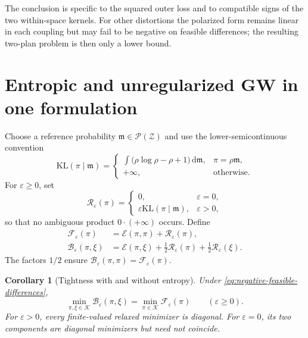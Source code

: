 \documentclass[11pt]{article}
\newtheorem{corollary}[theorem]{Corollary}
\theoremstyle{definition}
\theoremstyle{remark}
\newcommand{\Pcal}{\mathcal P}
\newcommand{\Kcal}{\mathcal K}
\newcommand{\Ee}{\mathcal E}
\newcommand{\Fcal}{\mathcal F}
\newcommand{\Bcal}{\mathcal B}
\newcommand{\Rcal}{\mathcal R}
\newcommand{\dd}{\,\mathrm d}
\newcommand{\eps}{\varepsilon}
\newcommand{\KL}{\mathrm{KL}}
\begin{document}
The conclusion is specific to the squared outer loss and to compatible signs
of the two within-space kernels.  For other distortions the polarized form
remains linear in each coupling but may fail to be negative on feasible
differences; the resulting two-plan problem is then only a lower bound.

\section{Entropic and unregularized GW in one formulation}
\label{sec:entropic-gw}

Choose a reference probability \(\mathfrak m\in\Pcal(\mathcal Z)\) and use
the lower-semicontinuous convention
\begin{equation}\label{eq:relative-entropy}
  \KL(\pi\mid\mathfrak m)
  =
  \begin{cases}
  \displaystyle
  \int\bigl(\rho\log\rho-\rho+1\bigr)\dd\mathfrak m,
  &\pi=\rho\mathfrak m,\\
  +\infty,&\text{otherwise}.
  \end{cases}
\end{equation}
For \(\eps\geq0\), set
\begin{equation}\label{eq:epsilon-regularizer}
  \Rcal_\eps(\pi)
  =
  \begin{cases}
    0,&\eps=0,\\
    \eps\KL(\pi\mid\mathfrak m),&\eps>0,
  \end{cases}
\end{equation}
so that no ambiguous product \(0\cdot(+\infty)\) occurs.  Define
\begin{align}
  \Fcal_\eps(\pi)
  &=\Ee(\pi,\pi)+\Rcal_\eps(\pi),
  \label{eq:epsilon-diagonal-objective}\\
  \Bcal_\eps(\pi,\xi)
  &=\Ee(\pi,\xi)
  +\frac12\Rcal_\eps(\pi)
  +\frac12\Rcal_\eps(\xi).
  \label{eq:epsilon-biconvex-objective}
\end{align}
The factors \(1/2\) ensure
\(
 \Bcal_\eps(\pi,\pi)=\Fcal_\eps(\pi)
\).

\begin{corollary}[Tightness with and without entropy]
\label{cor:entropic-tightness}
Under \eqref{eq:negative-feasible-differences},
\begin{equation}\label{eq:epsilon-tightness}
  \min_{\pi,\xi\in\Kcal}\Bcal_\eps(\pi,\xi)
  =
  \min_{\pi\in\Kcal}\Fcal_\eps(\pi)
  \qquad(\eps\geq0).
\end{equation}
For \(\eps>0\), every finite-valued relaxed minimizer is diagonal.  For
\(\eps=0\), its two components are diagonal minimizers but need not coincide.
\end{corollary}
\end{document}
